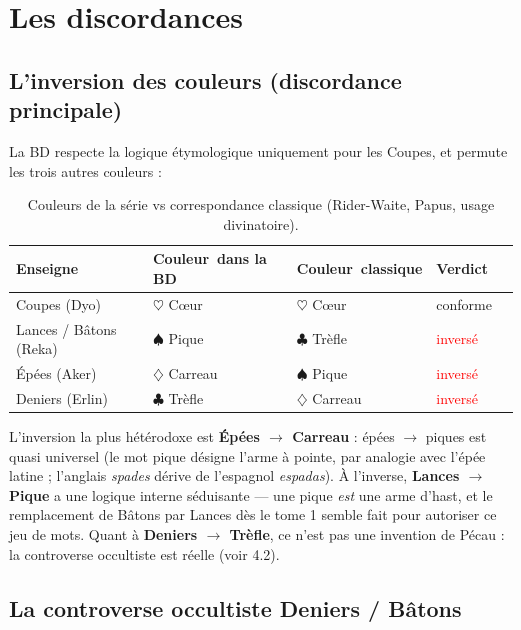 \documentclass[11pt,a5paper]{article}
\newcommand{\carreau}{\ensuremath{\diamondsuit}}
\newcommand{\coeur}{\ensuremath{\heartsuit}}
\newcommand{\pique}{\ensuremath{\spadesuit}}
\newcommand{\trefle}{\ensuremath{\clubsuit}}
\begin{document}
\section{Les discordances}

\subsection{L'inversion des couleurs (discordance principale)}

La BD respecte la logique étymologique uniquement pour les Coupes, et
permute les trois autres couleurs :

\begin{table}[h]
\centering
\begin{tabular}{p{} p{} p{} p{} p{}}
\toprule
\textbf{Enseigne} 		& \textbf{Couleur~\newline dans la BD} & \textbf{Couleur~\newline classique} & \textbf{Verdict} \\
\midrule
Coupes (Dyo) 			& \coeur{} Cœur 		& \coeur{} Cœur 		& \textcolor{green!55!black}{conforme} \\
Lances / Bâtons (Reka) 	& \pique{} Pique 		& \trefle{} Trèfle 		& \textcolor{red}{inversé} \\
Épées (Aker) 			& \carreau{} Carreau 	& \pique{} Pique 		& \textcolor{red}{inversé} \\
Deniers (Erlin) 		& \trefle{} Trèfle 		& \carreau{} Carreau 	& \textcolor{red}{inversé} \\
\bottomrule
\end{tabular}
\caption{Couleurs de la série vs correspondance classique (Rider-Waite, Papus, usage divinatoire).}
\end{table}

L'inversion la plus hétérodoxe est \textbf{Épées $\rightarrow$ Carreau} :
épées $\rightarrow$ piques est quasi universel (le mot \og pique \fg{}
désigne l'arme à pointe, par analogie avec l'épée latine ; l'anglais
\emph{spades} dérive de l'espagnol \emph{espadas}). À l'inverse,
\textbf{Lances $\rightarrow$ Pique} a une logique interne séduisante --- une
pique \emph{est} une arme d'hast, et le remplacement de \og Bâtons \fg{} par
\og Lances \fg{} dès le tome 1 semble fait pour autoriser ce jeu de mots.
Quant à \textbf{Deniers $\rightarrow$ Trèfle}, ce n'est pas une invention de
Pécau : la controverse occultiste est réelle (voir 4.2).

\subsection{La controverse occultiste Deniers / Bâtons}
\end{document}
